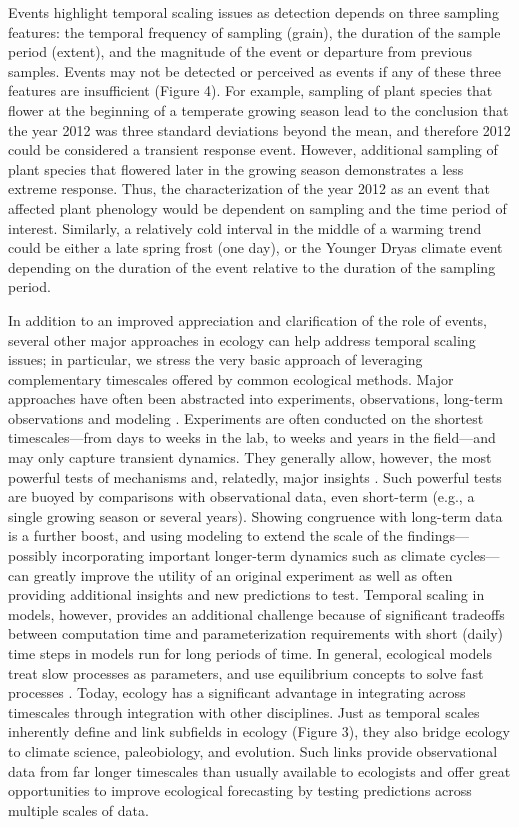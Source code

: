 \documentclass[11pt,a4paper,oneside]{article}
\begin{document}
Events highlight temporal scaling issues as detection depends on three sampling features: the temporal frequency of sampling (grain), the duration of the sample period (extent), and the magnitude of the event or departure from previous samples. Events may not be detected or perceived as events if any of these three features are insufficient (Figure 4). For example, sampling of plant species that flower at the beginning of a temperate growing season lead to the conclusion that the year 2012 was three standard deviations beyond the mean, and therefore 2012 could be considered a transient response event. However, additional sampling of plant species that flowered later in the growing season demonstrates a less extreme response. Thus, the characterization of the year 2012 as an event that affected plant phenology would be dependent on sampling and the time period of interest. Similarly, a relatively cold interval in the middle of a warming trend could be either a late spring frost (one day), or the Younger Dryas climate event \citep{Jackson:2009el} depending on the duration of the event relative to the duration of the sampling period. 

In addition to an improved appreciation and clarification of the role of events, several other major approaches in ecology can help address temporal scaling issues; in particular, we stress the very basic approach of leveraging complementary timescales offered by common ecological methods. Major approaches have often been abstracted into experiments, observations, long-term observations and modeling \citep{Carpenter:1992hk}. Experiments are often conducted on the shortest timescales---from days to weeks in the lab, to weeks and years in the field---and may only capture transient dynamics. They generally allow, however, the most powerful tests of mechanisms and, relatedly, major insights \citep{Chapin:1995af,Wolkovich:2012n,Laube2014}. Such powerful tests are buoyed by comparisons with observational data, even short-term (e.g., a single growing season or several years). Showing congruence with long-term data is a further boost, and using modeling to extend the scale of the findings---possibly incorporating important longer-term dynamics such as climate cycles---can greatly improve the utility of an original experiment as well as often providing additional insights and new predictions to test. Temporal scaling in models, however, provides an additional challenge because of significant tradeoffs between computation time and parameterization requirements with short (daily) time steps in models run for long periods of time. In general, ecological models treat slow processes as parameters, and use equilibrium concepts to solve fast processes \citep{Carpenter2000}. Today, ecology has a significant advantage in integrating across timescales through integration with other disciplines. Just as temporal scales inherently define and link subfields in ecology (Figure 3), they also bridge ecology to climate science, paleobiology, and evolution. Such links provide observational data from far longer timescales than usually available to ecologists and offer great opportunities to improve ecological forecasting by testing predictions across multiple scales of data. 
\end{document}

